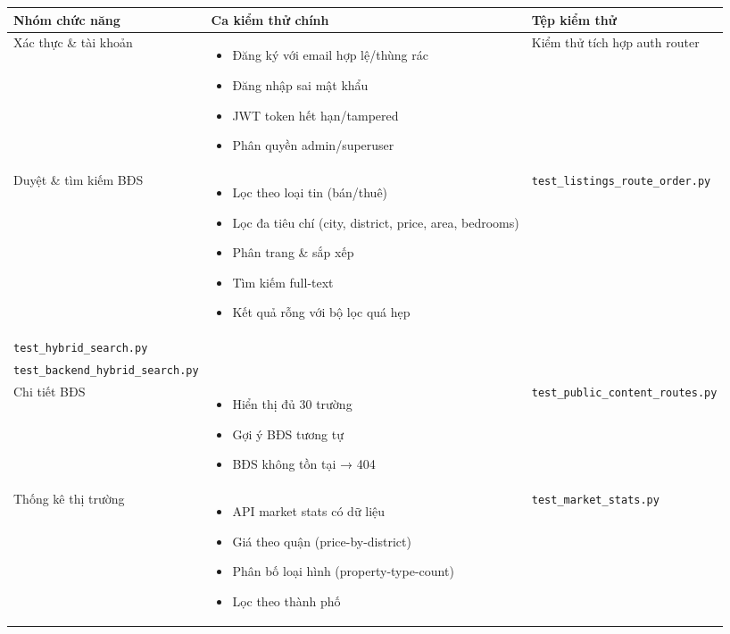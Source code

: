 \begin{longtable}{|p{3.5cm}|p{5cm}|p{5cm}|}
    \hline
    \textbf{Nhóm chức năng} & \textbf{Ca kiểm thử chính} & \textbf{Tệp kiểm thử} \\
    \hline
    Xác thực \& tài khoản & 
    \begin{itemize}
        \item Đăng ký với email hợp lệ/thùng rác
        \item Đăng nhập sai mật khẩu
        \item JWT token hết hạn/tampered
        \item Phân quyền admin/superuser
    \end{itemize} & 
    Kiểm thử tích hợp auth router \\
    \hline
    Duyệt \& tìm kiếm BĐS & 
    \begin{itemize}
        \item Lọc theo loại tin (bán/thuê)
        \item Lọc đa tiêu chí (city, district, price, area, bedrooms)
        \item Phân trang \& sắp xếp
        \item Tìm kiếm full-text
        \item Kết quả rỗng với bộ lọc quá hẹp
    \end{itemize} & 
    \texttt{test\_listings\_route\_order.py} \\
    \texttt{test\_hybrid\_search.py} \\
    \texttt{test\_backend\_hybrid\_search.py} \\
    \hline
    Chi tiết BĐS & 
    \begin{itemize}
        \item Hiển thị đủ 30 trường
        \item Gợi ý BĐS tương tự
        \item BĐS không tồn tại → 404
    \end{itemize} & 
    \texttt{test\_public\_content\_routes.py} \\
    \hline
    Thống kê thị trường & 
    \begin{itemize}
        \item API market stats có dữ liệu
        \item Giá theo quận (price-by-district)
        \item Phân bố loại hình (property-type-count)
        \item Lọc theo thành phố
    \end{itemize} & 
    \texttt{test\_market\_stats.py} \\

\end{longtable}
